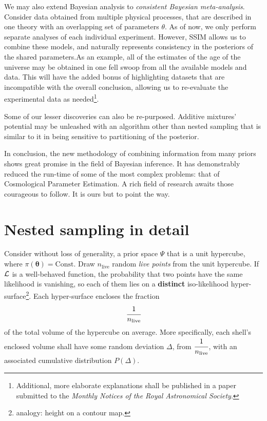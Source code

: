 \documentclass[usenatbib]{mnras}
\begin{document}
We may also extend Bayesian analysis to \emph{consistent Bayesian
  meta-analysis}. Consider data obtained from multiple physical
processes, that are described in one theory with an overlapping set of
parameters $\theta$. As of now, we only perform separate analyses of
each individual experiment. However, SSIM allows us to combine these
models, and naturally represents consistency in the posteriors of the
shared parameters.As an example, all of the estimates of the age of
the universe may be obtained in one fell swoop from all the available
models and data. This will have the added bonus of highlighting
datasets that are incompatible with the overall conclusion, allowing
us to re-evaluate the experimental data as needed\footnote{Additional,
  more elaborate explanations shall be published in a paper submitted
  to the \emph{Monthly Notices of the Royal Astronomical Society}.}.

Some of our lesser discoveries can also be re-purposed. Additive
mixtures' potential may be unleashed with an algorithm other than
nested sampling that is similar to it in being sensitive to
partitioning of the posterior.

In conclusion, the new methodology of combining information from many
priors shows great promise in the field of Bayesian inference. It has
demonstrably reduced the run-time of some of the most complex
problems: that of Cosmological Parameter Estimation. A rich field of
research awaits those courageous to follow. It is ours but to point
the way.




\appendix
\section{Nested sampling in detail}\label{sec:ns}
Consider without loss of generality, a prior space \(\Psi\) that is a
unit hypercube, where \(\pi(\bm{\theta}) = \text{Const.}\) Draw
\(n_\text{live}\) random \emph{live points} from the unit
hypercube. If \({\cal L}\) is a well-behaved function, the probability
that two points have the same likelihood is vanishing, so each of them
lies on a \textbf{distinct} iso-likelihood
hyper-surface\footnote{analogy: height on a contour map. }. Each
hyper-surface encloses the fraction
\begin{equation}
\cfrac{1}{n_\text{live}}
\end{equation}
of the total volume of the hypercube on average. More specifically,
each shell's enclosed volume shall have some random deviation \(\Delta\), from
\(\cfrac{1}{n_\text{live}}\), with an associated cumulative
distribution \(P(\Delta)\).
\end{document}
